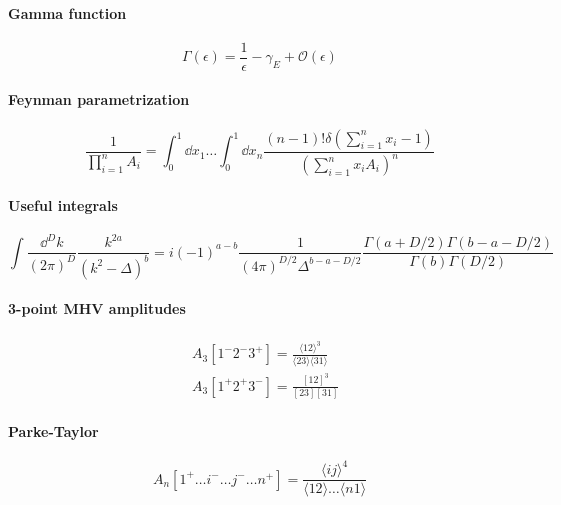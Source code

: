 
\paragraph{Gamma function}
\begin{equation*}
\Gamma(\epsilon) = \frac{1}{\epsilon} - \gamma_E + \mathcal{O}(\epsilon)
\end{equation*}

\paragraph{Feynman parametrization}
\begin{equation*}
\frac{1}{\prod_{i=1}^n A_i} = \int_0^1 \dd x_1 \ldots\int^1_0\dd x_n\frac{(n-1)!\delta(\sum_{i=1}^n x_i -1)}{(\sum_{i=1}^n x_i A_i)^n}
\end{equation*}

\paragraph{Useful integrals}
\begin{equation*}
\int\frac{\dd^D k}{(2\pi)^D}\frac{k^{2a}}{(k^2-\Delta)^b} = i(-1)^{a-b}\frac{1}{(4\pi)^{D/2}\Delta^{b-a-D/2}}\frac{\Gamma(a+D/2)\Gamma(b-a-D/2)}{\Gamma(b)\Gamma(D/2)}
\end{equation*}

\paragraph{3-point MHV amplitudes}
\begin{equation*}
\begin{split}
& A_3[1^-2^-3^+] = \frac{\langle 1 2 \rangle^3}{\langle 23 \rangle \langle 31 \rangle}
\\
& A_3[1^+2^+3^-] = \frac{[12]^3}{[23][31]}
\end{split}
\end{equation*}
\paragraph{Parke-Taylor}
\begin{equation*}
A_n[1^+\ldots i^-\ldots j^-\ldots n^+] = \frac{\langle i j \rangle^4}{\langle 12\rangle \ldots\langle n 1 \rangle}
\end{equation*}